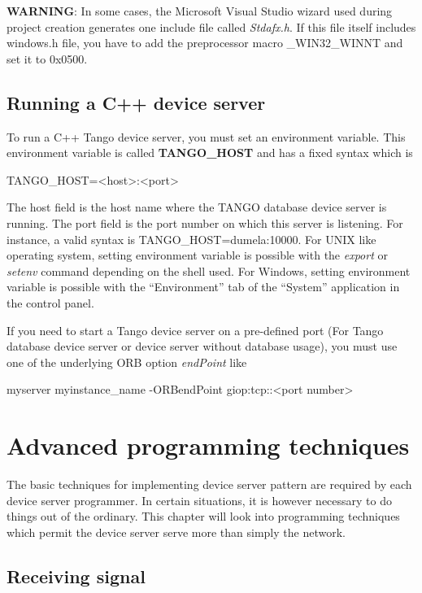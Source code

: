 \textbf{WARNING}: In some cases, the Microsoft Visual Studio wizard
used during project creation generates one include file called \emph{Stdafx.h}.
If this file itself includes windows.h file, you have to add the preprocessor
macro \_WIN32\_WINNT and set it to 0x0500.


\subsection{Running a C++ device server}
\label{Env variable}

To run a C++ Tango device server, you must set an environment variable.
This environment variable is called \textbf{TANGO\_HOST}
and has a fixed syntax which is \begin{center}TANGO\_HOST=<host>:<port>\end{center}The
host field is the host name where the TANGO database device server
is running. The port field is the port number on which this server
is listening. For instance, a valid syntax is TANGO\_HOST=dumela:10000.
For UNIX like operating system, setting environment variable is possible
with the \emph{export} or \emph{setenv} command depending on the shell
used. For Windows, setting environment variable is possible with the
``Environment'' tab of the ``System'' application in the control
panel.

If you need to start a Tango device server on a pre-defined port
(For Tango database device server or device server without database
usage), you must use one of the underlying ORB option \emph{endPoint}
like \begin{center}myserver myinstance\_name -ORBendPoint giop:tcp::<port
number>\end{center}


\section{Advanced programming techniques}

The basic techniques for implementing device server pattern are required
by each device server programmer. In certain situations, it is however
necessary to do things out of the ordinary. This chapter will look
into programming techniques which permit the device server serve more
than simply the network.


\subsection{Receiving signal}

